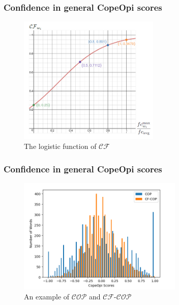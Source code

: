 \documentclass[mathserif]{beamer}
\begin{document}
\begin{frame}
\frametitle{Confidence in general CopeOpi scores}
\begin{figure}
\centering
\caption{The logistic function of $\mathcal{CF}$}
\includegraphics[width=0.6\textwidth]{./figure/conf.png}
\end{figure}
\end{frame}
\begin{frame}
\frametitle{Confidence in general CopeOpi scores}
\begin{figure}
\centering
\caption{An example of $\mathcal{COP}$ and $\mathcal{CF}\text{-}\mathcal{COP}$}
\includegraphics[width=0.7\textwidth]{./figure/conf_SA(EN)(A).png}
\end{figure}
\end{frame}
\end{document}
